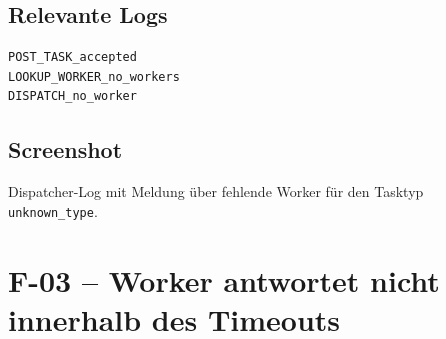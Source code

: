 \documentclass[a4paper,12pt]{article}
\begin{document}
\subsection*{Relevante Logs}

\begin{lstlisting}[style=log]
POST_TASK_accepted
LOOKUP_WORKER_no_workers
DISPATCH_no_worker
\end{lstlisting}

\subsection*{Screenshot}

Dispatcher-Log mit Meldung über fehlende Worker für den Tasktyp \texttt{unknown\_type}.

\newpage
\section*{F-03 -- Worker antwortet nicht innerhalb des Timeouts}
\end{document}
